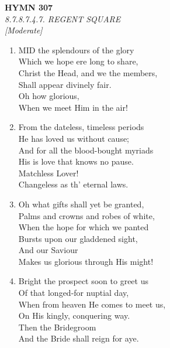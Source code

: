 \newpage
\begin{center}
    {\Large \textbf{HYMN 307}}
    \\
    \textit{8.7.8.7.4.7. REGENT SQUARE}
    \\
    \textit{\small [Moderate]}
\end{center}
\vspace{1em}

\begin{enumerate}
    \item MID the splendours of the glory \\
        Which we hope ere long to share, \\
        Christ the Head, and we the members, \\
        Shall appear divinely fair. \\
        Oh how glorious, \\
        When we meet Him in the air!

    \item From the dateless, timeless periods \\
        He has loved us without cause; \\
        And for all the blood-bought myriads \\
        His is love that knows no pause. \\
        Matchless Lover! \\
        Changeless as th' eternal laws.

    \item Oh what gifts shall yet be granted, \\
        Palms and crowns and robes of white, \\
        When the hope for which we panted \\
        Bursts upon our gladdened sight, \\
        And our Saviour \\
        Makes us glorious through His might!

    \item Bright the prospect soon to greet us \\
        Of that longed-for nuptial day, \\
        When from heaven He comes to meet us, \\
        On His kingly, conquering way. \\
        Then the Bridegroom \\
        And the Bride shall reign for aye.

\end{enumerate}

